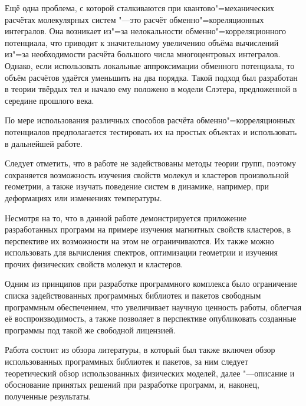 Ещё одна проблема, с которой сталкиваются при квантово"=механических расчётах
молекулярных систем "---это расчёт обменно"=кореляционных интегралов. Она
возникает из"=за нелокальности обменно"=корреляционного потенциала, что приводит
к значительному увеличению объёма вычислений из"=за необходимости расчёта
большого числа многоцентровых интегралов. Однако, если использовать локальные
аппроксимации обменного потенциала, то объём расчётов удаётся уменьшить на два
порядка. Такой подход был разработан в теории твёрдых тел и начало ему положено
в модели Слэтера, предложенной в середине прошлого века.

По мере использования различных способов расчёта обменно"=корреляционных
потенциалов предполагается тестировать их на простых объектах и использовать в
дальнейшей работе.

Следует отметить, что в работе не задействованы методы теории групп, поэтому сохраняется возможность изучения свойств
молекул и кластеров произвольной геометрии, а также изучать поведение систем в динамике, например, при деформациях
или изменениях температуры.

Несмотря на то, что в данной работе демонстрируется приложение разработанных программ на примере изучения магнитных
свойств кластеров, в перспективе их возможности на этом не ограничиваются. Их также можно использовать для вычисления
спектров, оптимизации геометрии и изучения прочих физических свойств молекул и кластеров.

Одним из принципов при разработке программного комплекса было ограничение списка задействованных программных
библиотек и пакетов свободным программным обеспечением, что увеличивает научную ценность работы, облегчая её
воспроизводимость, а также позволяет в перспективе опубликовать созданные программы под такой же свободной лицензией.

Работа состоит из обзора литературы, в который был также включен обзор использованных программных библиотек и пакетов,
за ним следует теоретический обзор использованных физических моделей, далее "---описание и обоснование принятых решений
при разработке программ, и, наконец, полученные результаты.
